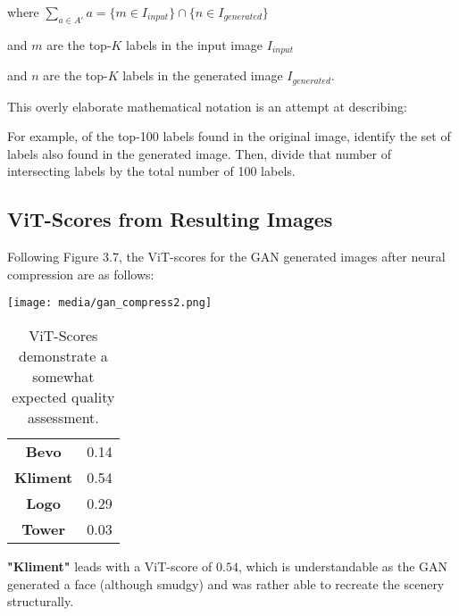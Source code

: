 where $\sum_{a \in A'} {a}  = \lbrace{m \in I_{input}}\rbrace \cap \lbrace{n \in I_{generated}}\rbrace$


and $m$ are the top-$K$ labels in the input image $I_{input}$

and $n$ are the top-$K$ labels in the generated image $I_{generated}$.

\vspace{12pt}

This overly elaborate mathematical notation is an attempt at describing:




For example, of the top-100 labels found in the original image, 
identify the set of labels also found in the generated image. 
Then, divide that number of intersecting
labels by the total number of 100 labels.


\subsection{ViT-Scores from Resulting Images}


Following Figure 3.7, the ViT-scores for the GAN generated images after neural compression
are as follows:

\begin{center}
	\texttt{[image: media/gan\_compress2.png]}
\end{center}

\begin{table}[H]
\begin{center}
\begin{tabular}{|c|c|}
\hline
\textbf{Bevo}	& 0.14\\
\textbf{Kliment}	& 0.54\\
\textbf{Logo}	& 0.29\\
\textbf{Tower} & 0.03\\\hline

\end{tabular}
\caption[ViT-Scores of Generated Images]{ViT-Scores demonstrate a somewhat expected quality assessment.}
\end{center}
\end{table}



\textbf{"Kliment"} leads with a ViT-score of $0.54$, which is understandable as the GAN 
generated a face (although smudgy) and was rather able to recreate the scenery structurally.

